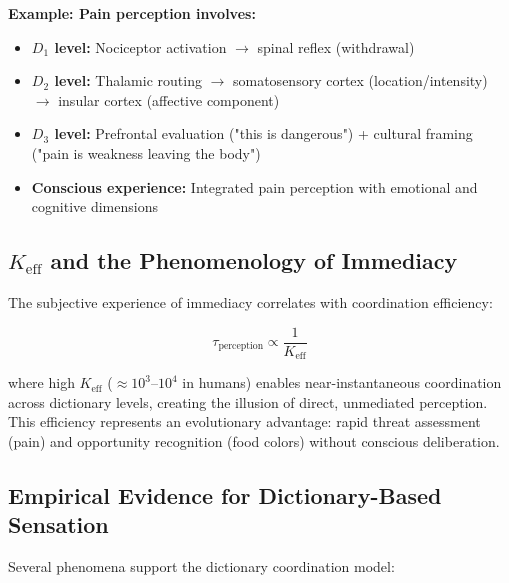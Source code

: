 \documentclass[12pt,a4paper]{article}
\newcommand{\eff}{\mathrm{eff}}
\newcommand{\Ke}{K_{\eff}}
\begin{document}
	\textbf{Example: Pain perception involves:}
	\begin{itemize}
		\item \textbf{$D_1$ level:} Nociceptor activation $\rightarrow$ spinal reflex (withdrawal)
		\item \textbf{$D_2$ level:} Thalamic routing $\rightarrow$ somatosensory cortex (location/intensity) $\rightarrow$ insular cortex (affective component)
		\item \textbf{$D_3$ level:} Prefrontal evaluation ("this is dangerous") + cultural framing ("pain is weakness leaving the body")
		\item \textbf{Conscious experience:} Integrated pain perception with emotional and cognitive dimensions
	\end{itemize}
	
	\subsection{$\Ke$ and the Phenomenology of Immediacy}
	
	The subjective experience of immediacy correlates with coordination efficiency:
	
	\[
	\tau_{\text{perception}} \propto \frac{1}{\Ke}
	\]
	
	where high $\Ke$ ($\approx 10^3$–$10^4$ in humans) enables near-instantaneous coordination across dictionary levels, creating the illusion of direct, unmediated perception. This efficiency represents an evolutionary advantage: rapid threat assessment (pain) and opportunity recognition (food colors) without conscious deliberation.
	
	\subsection{Empirical Evidence for Dictionary-Based Sensation}
	
	Several phenomena support the dictionary coordination model:
	
\end{document}
